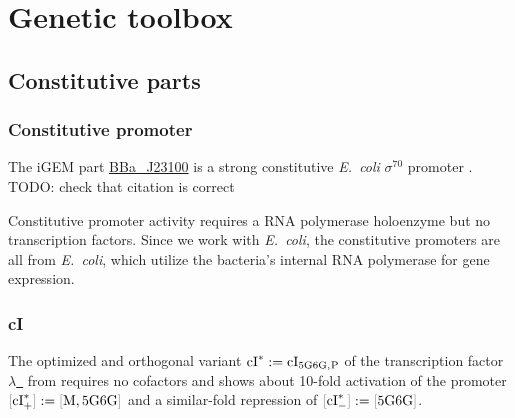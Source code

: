 \documentclass[12pt,notitlepage]{article}
\let\cite\citep
\newcommand{\TODO}[1]{\textrm{\color{red}TODO: #1}}
\newcommand{\cbra}[1]{{\ensuremath{\color{gray}{#1}}}}
\newcommand{\promoter}[1]{{{\cbra{[}\ce{#1}\cbra{]}}}}
\newcommand{\act}{\ {\ensuremath{\mathbin{\to}}}\ }
\newcommand{\hh}[1]{{\color{Purple}#1}}
\newcommand{\ra}[1]{{\color{Blue}#1}}
\begin{document}
\section{Genetic toolbox} \label{s:genetic}


\subsection{Constitutive parts} \label{ss:const}

\subsubsection*{Constitutive promoter} \label{ss:Pc}

\ra{
The iGEM part 
\href{http://parts.igem.org/Part:BBa_J23100}{BBa\_J23100}
is a strong constitutive \emph{E.~coli} $\sigma^{70}$ promoter
\cite{iGem_Pc}.
%
%
\TODO{check that citation is correct}
}

\hh{
Constitutive promoter activity requires \ra{a} RNA polymerase holoenzyme
but no transcription factors. 
%
Since we work with \emph{E.~coli},
the constitutive promoters are all from \emph{E.~coli}, 
which utilize the bacteria's internal RNA polymerase for gene expression. 

}



\subsubsection*{cI} \label{ss:cI}

\ra{
The optimized and orthogonal variant
$\ce{cI^*} := \ce{cI_{5G6G,P}}$
of the transcription factor 
\href{https://www.uniprot.org/uniprot/P03034}{$\lambda$~\ce{cI}}
from
\cite[\href{https://www.nature.com/articles/ncomms13858/figures/4}{Fig.~4c/d}]{BroedelJaramilloIsalan2016}
requires no cofactors
and
shows 
about 10-fold activation of the promoter
$\promoter{cI^*_+} := \promoter{M,{5G6G}}$
and 
a similar-fold repression of 
$\promoter{cI^*_-} := \promoter{{5G6G}}$.
%
%
}
\end{document}
